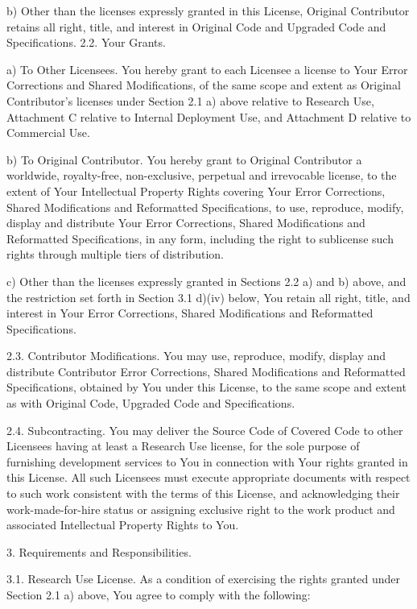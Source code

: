 {b) Other than the licenses expressly granted in this License, Original
Contributor retains all right, title, and interest in Original Code
and Upgraded Code and Specifications.  2.2.  Your Grants.

a) To Other Licensees.  You hereby grant to each Licensee a license to
Your Error Corrections and Shared Modifications, of the same scope and
extent as Original Contributor's licenses under Section 2.1 a) above
relative to Research Use, Attachment C relative to Internal Deployment
Use, and Attachment D relative to Commercial Use.

b) To Original Contributor.  You hereby grant to Original Contributor
a worldwide, royalty-free, non-exclusive, perpetual and irrevocable
license, to the extent of Your Intellectual Property Rights covering
Your Error Corrections, Shared Modifications and Reformatted
Specifications, to use, reproduce, modify, display and distribute Your
Error Corrections, Shared Modifications and Reformatted
Specifications, in any form, including the right to sublicense such
rights through multiple tiers of distribution.

c) Other than the licenses expressly granted in Sections 2.2 a) and b)
above, and the restriction set forth in Section 3.1 d)(iv) below, You
retain all right, title, and interest in Your Error Corrections,
Shared Modifications and Reformatted Specifications.

2.3.  Contributor Modifications.  You may use, reproduce, modify,
display and distribute Contributor Error Corrections, Shared
Modifications and Reformatted Specifications, obtained by You under
this License, to the same scope and extent as with Original Code,
Upgraded Code and Specifications.

2.4.  Subcontracting.  You may deliver the Source Code of Covered Code
to other Licensees having at least a Research Use license, for the
sole purpose of furnishing development services to You in connection
with Your rights granted in this License.  All such Licensees must
execute appropriate documents with respect to such work consistent
with the terms of this License, and acknowledging their
work-made-for-hire status or assigning exclusive right to the work
product and associated Intellectual Property Rights to You.

3.  Requirements and Responsibilities.

3.1.  Research Use License.  As a condition of exercising the rights
granted under Section 2.1 a) above, You agree to comply with the
following:

}

